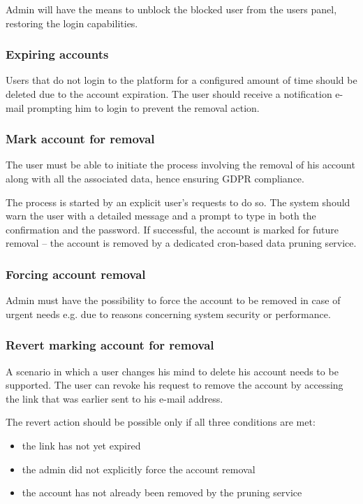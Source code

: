 \documentclass[a4paper,twoside,12pt]{book}
\begin{document}
Admin will have the means to unblock the blocked user from the users panel, restoring the login capabilities.

\subsubsection{Expiring accounts}

Users that do not login to the platform for a configured amount of time should be deleted due to the account expiration. The user should receive a notification e-mail prompting him to login to prevent the removal action.

\subsubsection{Mark account for removal}

The user must be able to initiate the process involving the removal of his account along with all the associated data, hence ensuring GDPR compliance.

The process is started by an explicit user's requests to do so. The system should warn the user with a detailed message and a prompt to type in both the confirmation and the password. If successful, the account is marked for future removal -- the account is removed by a dedicated cron-based data pruning service.

\subsubsection{Forcing account removal}

Admin must have the possibility to force the account to be removed in case of urgent needs e.g. due to reasons concerning system security or performance.

\subsubsection{Revert marking account for removal}

A scenario in which a user changes his mind to delete his account needs to be supported. The user can revoke his request to remove the account by accessing the link that was earlier sent to his e-mail address.

The revert action should be possible only if all three conditions are met:
\begin{itemize}
\item the link has not yet expired
\item the admin did not explicitly force the account removal
\item the account has not already been removed by the pruning service
\end{itemize}
\end{document}

